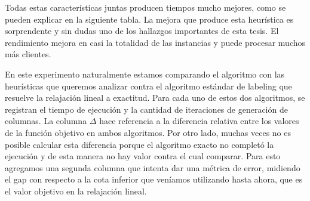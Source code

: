 Todas estas características juntas producen tiempos mucho mejores, como se pueden explicar en la siguiente tabla. La mejora que produce esta heurística es sorprendente y sin dudas uno de los hallazgos importantes de esta tesis. El rendimiento mejora en casi la totalidad de las instancias y puede procesar muchos más clientes.

En este experimento naturalmente estamos comparando el algoritmo con las heurísticas que queremos analizar contra el algoritmo estándar de labeling que resuelve la relajación lineal a exactitud. Para cada uno de estos dos algoritmos, se registran el tiempo de ejecución y la cantidad de iteraciones de generación de columnas. La columna $\Delta$ hace referencia a la diferencia relativa entre los valores de la función objetivo en ambos algoritmos. Por otro lado, muchas veces no es posible calcular esta diferencia porque el algoritmo exacto no completó la ejecución y de esta manera no hay valor contra el cual comparar. Para esto agregamos una segunda columna que intenta dar una métrica de error, midiendo el gap con respecto a la cota inferior que veníamos utilizando hasta ahora, que es el valor objetivo en la relajación lineal.

